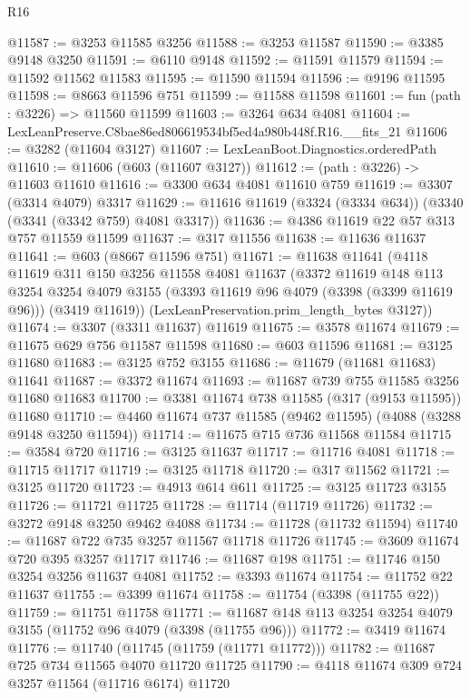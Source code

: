 \begin{lexlean}{R16}
\begin{coremodule}
@11587 := @3253 @11585 @3256
@11588 := @3253 @11587
@11590 := @3385 @9148 @3250
@11591 := @6110 @9148
@11592 := @11591 @11579
@11594 := @11592 @11562 @11583
@11595 := @11590 @11594
@11596 := @9196 @11595
@11598 := @8663 @11596 @751
@11599 := @11588 @11598
@11601 := fun (path : @3226) => @11560 @11599
@11603 := @3264 @634 @4081
@11604 := LexLeanPreserve.C8bae86ed806619534bf5ed4a980b448f.R16.__fits_21
@11606 := @3282 (@11604 @3127)
@11607 := LexLeanBoot.Diagnostics.orderedPath
@11610 := @11606 (@603 (@11607 @3127))
@11612 := (path : @3226) -> @11603 @11610
@11616 := @3300 @634 @4081 @11610 @759
@11619 := @3307 (@3314 @4079) @3317
@11629 := @11616 @11619 (@3324 (@3334 @634)) (@3340 (@3341 (@3342 @759) @4081 @3317))
@11636 := @4386 @11619 @22 @57 @313 @757 @11559 @11599
@11637 := @317 @11556
@11638 := @11636 @11637
@11641 := @603 (@8667 @11596 @751)
@11671 := @11638
    @11641
    (@4118
      @11619
      @311
      @150
      @3256
      @11558
      @4081
      @11637
      (@3372
        @11619
        @148
        @113
        @3254
        @3254
        @4079
        @3155
        (@3393 @11619 @96 @4079 (@3398 (@3399 @11619 @96)))
        (@3419 @11619))
      (LexLeanPreservation.prim_length_bytes @3127))
@11674 := @3307 (@3311 @11637) @11619
@11675 := @3578 @11674
@11679 := @11675 @629 @756 @11587 @11598
@11680 := @603 @11596
@11681 := @3125 @11680
@11683 := @3125 @752 @3155
@11686 := @11679 (@11681 @11683) @11641
@11687 := @3372 @11674
@11693 := @11687 @739 @755 @11585 @3256 @11680 @11683
@11700 := @3381 @11674 @738 @11585 (@317 (@9153 @11595)) @11680
@11710 := @4460 @11674 @737 @11585 (@9462 @11595) (@4088 (@3288 @9148 @3250 @11594))
@11714 := @11675 @715 @736 @11568 @11584
@11715 := @3584 @720
@11716 := @3125 @11637
@11717 := @11716 @4081
@11718 := @11715 @11717
@11719 := @3125 @11718
@11720 := @317 @11562
@11721 := @3125 @11720
@11723 := @4913 @614 @611
@11725 := @3125 @11723 @3155
@11726 := @11721 @11725
@11728 := @11714 (@11719 @11726)
@11732 := @3272 @9148 @3250 @9462 @4088
@11734 := @11728 (@11732 @11594)
@11740 := @11687 @722 @735 @3257 @11567 @11718 @11726
@11745 := @3609 @11674 @720 @395 @3257 @11717
@11746 := @11687 @198
@11751 := @11746 @150 @3254 @3256 @11637 @4081
@11752 := @3393 @11674
@11754 := @11752 @22 @11637
@11755 := @3399 @11674
@11758 := @11754 (@3398 (@11755 @22))
@11759 := @11751 @11758
@11771 := @11687 @148 @113 @3254 @3254 @4079 @3155 (@11752 @96 @4079 (@3398 (@11755 @96)))
@11772 := @3419 @11674
@11776 := @11740 (@11745 (@11759 (@11771 @11772)))
@11782 := @11687 @725 @734 @11565 @4070 @11720 @11725
@11790 := @4118 @11674 @309 @724 @3257 @11564 (@11716 @6174) @11720

\end{coremodule}
\end{lexlean}
